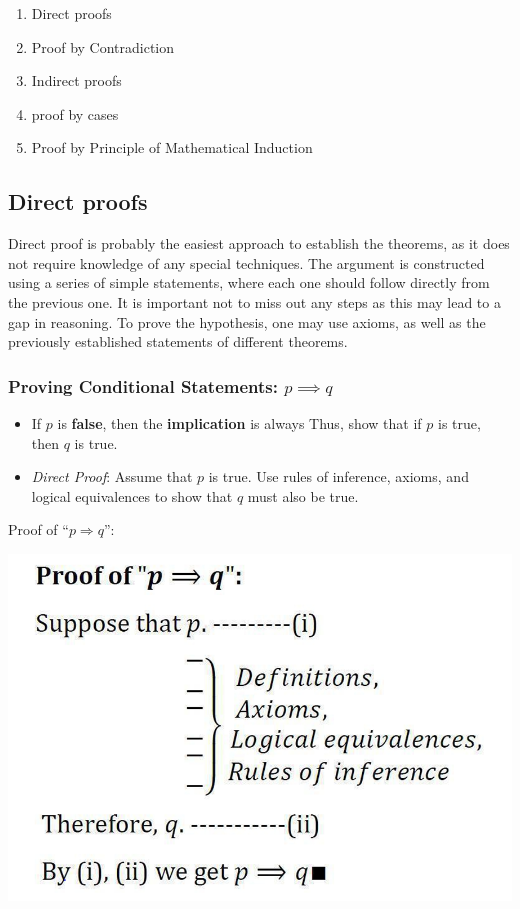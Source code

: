 \documentclass[
]{book}
\providecommand{\tightlist}{%
  \setlength{\itemsep}{0pt}\setlength{\parskip}{0pt}}
\theoremstyle{definition}
\theoremstyle{definition}
\theoremstyle{definition}
\theoremstyle{definition}
\theoremstyle{remark}
\begin{document}
\begin{enumerate}
\def\labelenumi{\arabic{enumi}.}
\tightlist
\item
  Direct proofs
\item
  Proof by Contradiction
\item
  Indirect proofs
\item
  proof by cases
\item
  Proof by Principle of Mathematical Induction
\end{enumerate}

\subsection{Direct proofs}\label{direct-proofs}

Direct proof is probably the easiest approach to establish the theorems, as it does not require knowledge of any special techniques. The argument is constructed using a series of simple statements, where each one should follow directly from the previous one. It is important not to miss out any steps as this may lead to a gap in reasoning. To prove the hypothesis, one may use axioms, as well as the previously established statements of different theorems.

\subsubsection{\texorpdfstring{Proving Conditional Statements: \(p\implies q\)}{Proving Conditional Statements: p\textbackslash implies q}}\label{proving-conditional-statements-pimplies-q}

\begin{itemize}
\item
  If \(p\) is \textbf{false}, then the \textbf{implication} is always
  Thus, show that if \(p\) is true, then \(q\) is true.
\item
  \emph{Direct Proof}: Assume that \(p\) is true. Use rules of inference, axioms, and logical equivalences to show that \(q\) must also be true.
\end{itemize}

Proof of ``\(p \Rightarrow q\)'':

\includegraphics[width=0.6\linewidth,height=\textheight,keepaspectratio]{fig/fig3.png}
\end{document}
